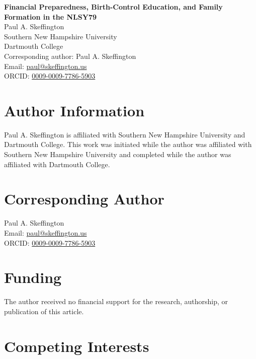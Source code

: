 \documentclass[12pt]{article}
\begin{document}
\begin{center}
{\Large \textbf{Financial Preparedness, Birth-Control Education, and Family Formation in the NLSY79}}\\[1.5em]

{\large Paul A. Skeffington}\\[0.75em]

Southern New Hampshire University\\
Dartmouth College\\[0.75em]

Corresponding author: Paul A. Skeffington\\
Email: \href{mailto:paul@skeffington.us}{paul@skeffington.us}\\
ORCID: \href{https://orcid.org/0009-0009-7786-5903}{0009-0009-7786-5903}
\end{center}

\vspace{2em}

\section*{Author Information}

Paul A. Skeffington is affiliated with Southern New Hampshire University and Dartmouth College. This work was initiated while the author was affiliated with Southern New Hampshire University and completed while the author was affiliated with Dartmouth College.

\section*{Corresponding Author}

Paul A. Skeffington\\
Email: \href{mailto:paul@skeffington.us}{paul@skeffington.us}\\
ORCID: \href{https://orcid.org/0009-0009-7786-5903}{0009-0009-7786-5903}

\section*{Funding}

The author received no financial support for the research, authorship, or publication of this article.

\section*{Competing Interests}
\end{document}
